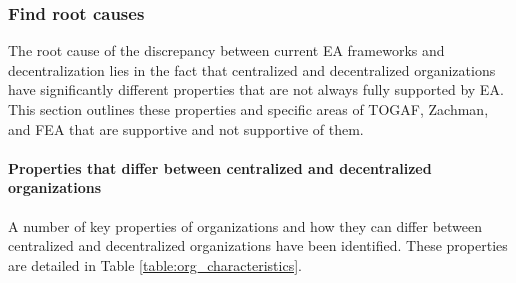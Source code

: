 \subsubsection{Find root causes}

The root cause of the discrepancy between current EA frameworks and decentralization lies in the fact that centralized and decentralized organizations have significantly different properties that are not always fully supported by EA. This section outlines these properties and specific areas of TOGAF, Zachman, and FEA that are supportive and not supportive of them. 

\paragraph*{Properties that differ between centralized and decentralized organizations}

A number of key properties of organizations and how they can differ between centralized and decentralized organizations have been identified.  These properties are detailed in Table \ref{table:org_characteristics}.

